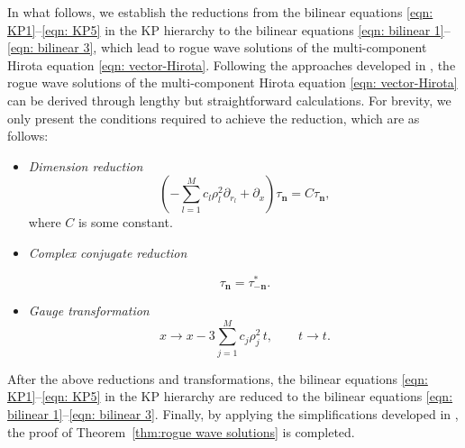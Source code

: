 \documentclass[preprint,3p,10pt]{elsarticle}
\theoremstyle{definition}
\begin{document}
In what follows, we establish the reductions from the bilinear equations \eqref{eqn: KP1}–\eqref{eqn: KP5} in the KP hierarchy to the bilinear equations \eqref{eqn: bilinear 1}–\eqref{eqn: bilinear 3}, which lead to rogue wave solutions of the multi-component Hirota equation \eqref{eqn: vector-Hirota}. Following the approaches developed in \cite{ohta2012general}, the rogue wave solutions of the multi-component Hirota equation \eqref{eqn: vector-Hirota} can be derived through lengthy but straightforward calculations. For brevity, we only present the conditions required to achieve the reduction, which are as follows:

\begin{itemize}
  \item [i)] {\it Dimension reduction}
  \begin{equation}
\left(-\sum_{l=1}^M c_l \rho_l^2 \partial_{r_l}+\partial_x\right) \tau_{\mathbf{n}}= C \tau_{\mathbf{n}},
  \end{equation}
  where $C$ is some constant.

  \item [ii)] {\it Complex conjugate reduction}

  \begin{equation}\label{complex conjugacy condition}
    \tau_{\mathbf{n}} = \tau_{-\mathbf{n}}^*.
  \end{equation}



  \item [iii)]{\it  Gauge transformation}
\begin{equation}
    x \to x - 3\sum_{j=1}^M c_j\rho_j^2\, t, \qquad t \to t.
\end{equation}

\end{itemize}
After the above reductions and transformations, the bilinear equations \eqref{eqn: KP1}–\eqref{eqn: KP5} in the KP hierarchy are reduced to the bilinear equations \eqref{eqn: bilinear 1}–\eqref{eqn: bilinear 3}. Finally, by applying the simplifications developed in \cite{ohta2012general}, the proof of Theorem~\ref{thm:rogue wave solutions} is completed.
\end{document}
